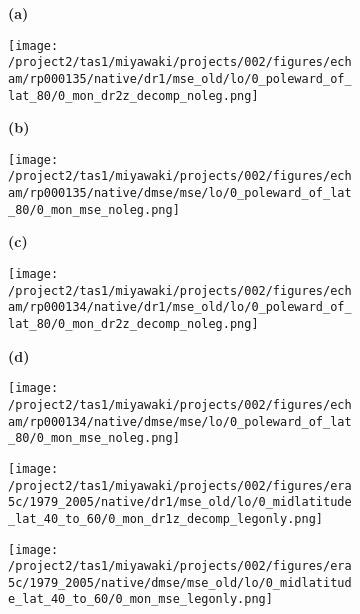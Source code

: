 \documentclass[preview]{standalone}
\begin{document}
\begin{figure}
  \begin{subfigure}[t]{0.05\textwidth}
    \textbf{\normalsize{(a)}}
  \end{subfigure}
  \begin{subfigure}[t]{0.45\textwidth}
    \texttt{[image: /project2/tas1/miyawaki/projects/002/figures/echam/rp000135/native/dr1/mse\_old/lo/0\_poleward\_of\_lat\_80/0\_mon\_dr2z\_decomp\_noleg.png]}
  \end{subfigure}
  \begin{subfigure}[t]{0.05\textwidth}
    \textbf{\normalsize{(b)}}
  \end{subfigure}
  \begin{subfigure}[t]{0.45\textwidth}
    \texttt{[image: /project2/tas1/miyawaki/projects/002/figures/echam/rp000135/native/dmse/mse/lo/0\_poleward\_of\_lat\_80/0\_mon\_mse\_noleg.png]}
  \end{subfigure}

  \begin{subfigure}[t]{0.05\textwidth}
    \textbf{\normalsize{(c)}}
  \end{subfigure}
  \begin{subfigure}[t]{0.45\textwidth}
    \texttt{[image: /project2/tas1/miyawaki/projects/002/figures/echam/rp000134/native/dr1/mse\_old/lo/0\_poleward\_of\_lat\_80/0\_mon\_dr2z\_decomp\_noleg.png]}
  \end{subfigure}
  \begin{subfigure}[t]{0.05\textwidth}
    \textbf{\normalsize{(d)}}
  \end{subfigure}
  \begin{subfigure}[t]{0.45\textwidth}
    \texttt{[image: /project2/tas1/miyawaki/projects/002/figures/echam/rp000134/native/dmse/mse/lo/0\_poleward\_of\_lat\_80/0\_mon\_mse\_noleg.png]}
  \end{subfigure}

  \begin{subfigure}[t]{0.05\textwidth}
  \end{subfigure}
  \begin{subfigure}[t]{0.45\textwidth}
    \texttt{[image: /project2/tas1/miyawaki/projects/002/figures/era5c/1979\_2005/native/dr1/mse\_old/lo/0\_midlatitude\_lat\_40\_to\_60/0\_mon\_dr1z\_decomp\_legonly.png]}
  \end{subfigure}
  \begin{subfigure}[t]{0.1\textwidth}
  \end{subfigure}
  \begin{subfigure}[t]{0.4\textwidth}
    \texttt{[image: /project2/tas1/miyawaki/projects/002/figures/era5c/1979\_2005/native/dmse/mse\_old/lo/0\_midlatitude\_lat\_40\_to\_60/0\_mon\_mse\_legonly.png]}
  \end{subfigure}

\end{figure}
\end{document}
